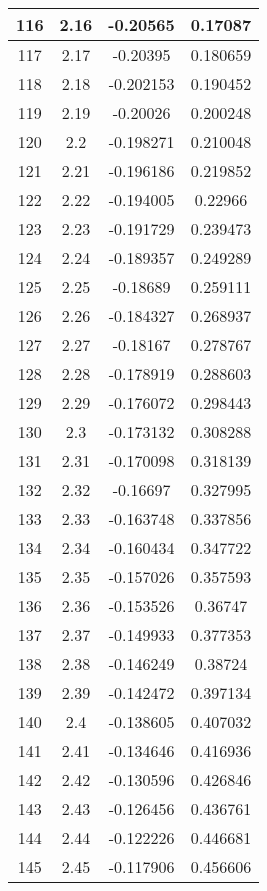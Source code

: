 \begin{table}
\begin{center}
\begin{tabular}{c|c|c|c}
			116 & 2.16 & -0.20565 & 0.17087 \\
			\hline
			117 & 2.17 & -0.20395 & 0.180659 \\
			\hline
			118 & 2.18 & -0.202153 & 0.190452 \\
			\hline
			119 & 2.19 & -0.20026 & 0.200248 \\
			\hline
			120 & 2.2 & -0.198271 & 0.210048 \\
			\hline
			121 & 2.21 & -0.196186 & 0.219852 \\
			\hline
			122 & 2.22 & -0.194005 & 0.22966 \\
			\hline
			123 & 2.23 & -0.191729 & 0.239473 \\
			\hline
			124 & 2.24 & -0.189357 & 0.249289 \\
			\hline
			125 & 2.25 & -0.18689 & 0.259111 \\
			\hline
			126 & 2.26 & -0.184327 & 0.268937 \\
			\hline
			127 & 2.27 & -0.18167 & 0.278767 \\
			\hline
			128 & 2.28 & -0.178919 & 0.288603 \\
			\hline
			129 & 2.29 & -0.176072 & 0.298443 \\
			\hline
			130 & 2.3 & -0.173132 & 0.308288 \\
			\hline
			131 & 2.31 & -0.170098 & 0.318139 \\
			\hline
			132 & 2.32 & -0.16697 & 0.327995 \\
			\hline
			133 & 2.33 & -0.163748 & 0.337856 \\
			\hline
			134 & 2.34 & -0.160434 & 0.347722 \\
			\hline
			135 & 2.35 & -0.157026 & 0.357593 \\
			\hline
			136 & 2.36 & -0.153526 & 0.36747 \\
			\hline
			137 & 2.37 & -0.149933 & 0.377353 \\
			\hline
			138 & 2.38 & -0.146249 & 0.38724 \\
			\hline
			139 & 2.39 & -0.142472 & 0.397134 \\
			\hline
			140 & 2.4 & -0.138605 & 0.407032 \\
			\hline
			141 & 2.41 & -0.134646 & 0.416936 \\
			\hline
			142 & 2.42 & -0.130596 & 0.426846 \\
			\hline
			143 & 2.43 & -0.126456 & 0.436761 \\
			\hline
			144 & 2.44 & -0.122226 & 0.446681 \\
			\hline
			145 & 2.45 & -0.117906 & 0.456606 \\

\end{tabular}
\end{center}
\end{table}
